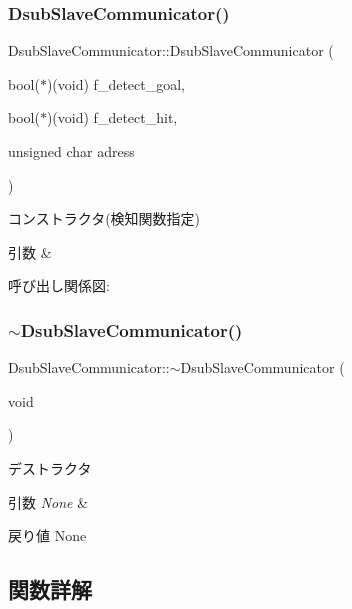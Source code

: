 \subsubsection{\texorpdfstring{DsubSlaveCommunicator()}{DsubSlaveCommunicator()}\hspace{0.1cm}{\footnotesize\ttfamily [2/2]}}
{\footnotesize\ttfamily Dsub\+Slave\+Communicator\+::\+Dsub\+Slave\+Communicator (\begin{DoxyParamCaption}\item[{bool($\ast$)(void)}]{f\+\_\+detect\+\_\+goal,  }\item[{bool($\ast$)(void)}]{f\+\_\+detect\+\_\+hit,  }\item[{unsigned char}]{adress }\end{DoxyParamCaption})}



コンストラクタ(検知関数指定) 


\begin{DoxyParams}{引数}
{\em } & \\
\hline
\end{DoxyParams}
呼び出し関係図\+:
\mbox{\label{class_dsub_slave_communicator_af3369086cde883a07f686203a41aab13}} 
\subsubsection{\texorpdfstring{$\sim$DsubSlaveCommunicator()}{~DsubSlaveCommunicator()}}
{\footnotesize\ttfamily Dsub\+Slave\+Communicator\+::$\sim$\+Dsub\+Slave\+Communicator (\begin{DoxyParamCaption}\item[{void}]{ }\end{DoxyParamCaption})}



デストラクタ 


\begin{DoxyParams}{引数}
{\em None} & \\
\hline
\end{DoxyParams}
\begin{DoxyReturn}{戻り値}
None 
\end{DoxyReturn}


\subsection{関数詳解}
\mbox{\label{class_dsub_slave_communicator_aef578741915e2e109b7b4d7813693cfe}} 
